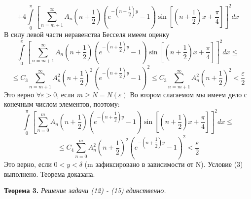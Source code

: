 \documentclass[12pt, a4paper]{article}
\begin{document}
	\begin{equation*}
		+ 4\int\limits_0^\pi \left[	\sum\limits_{n=m+1}^{\infty} A_n\left(n+\dfrac12\right) \left( e^{-\left(n+\dfrac12\right)y} - 1\right) \sin{\left[\left(n+\dfrac12\right) x  + \dfrac\pi4\right]} \right]^2 dx
	\end{equation*}
	В силу левой части неравенства Бесселя имеем оценку
	\begin{equation*}
		\int\limits_0^\pi \left[	\sum\limits_{n=m+1}^{\infty} A_n\left(n+\dfrac12\right) \left( e^{-\left(n+\dfrac12\right)y} - 1\right) \sin{\left[\left(n+\dfrac12\right) x  + \dfrac\pi4\right]} \right]^2 dx \leq 
	\end{equation*}
	\begin{equation*}
		\leq  C_3 \sum\limits_{n=m+1}^{\infty} A_n^2 \left(n+\dfrac12\right)^2 \left(e^{-\left(n+\dfrac12\right)y} - 1\right)^2 \leq C_3 \sum\limits_{n=m+1}^{\infty} A_n^2 \left(n+\dfrac12\right)^2 < \dfrac{\varepsilon}{2}
	\end{equation*}
	Это верно $\forall \varepsilon > 0$, если $m \geq N =N(\varepsilon)$\newline
	Во втором слагаемом мы имеем дело с конечным числом элементов, поэтому:
	\begin{equation*}
		\int\limits_0^\pi \left[	\sum\limits_{n=0}^{m} A_n\left(n+\dfrac12\right) \left( e^{-\left(n+\dfrac12\right)y} - 1\right) \sin{\left[\left(n+\dfrac12\right) x  + \dfrac\pi4\right]} \right]^2 dx \leq
	\end{equation*}
	\begin{equation*}
		\leq C_4 \sum\limits_{n=0}^{m} A_n^2 \left(n +\dfrac12\right)^2 \left(e^{-\left(n+\dfrac12\right)y} - 1\right)^2 < \dfrac{\varepsilon}{2}
	\end{equation*}
	Это верно, если $0 < y < \delta$ (m зафиксировано в зависимости от N). Условие (3) выполнено. Теорема доказана.

\textbf{Теорема 3.} \textit{Решение задачи (12) - (15) единственно.}
\end{document}
